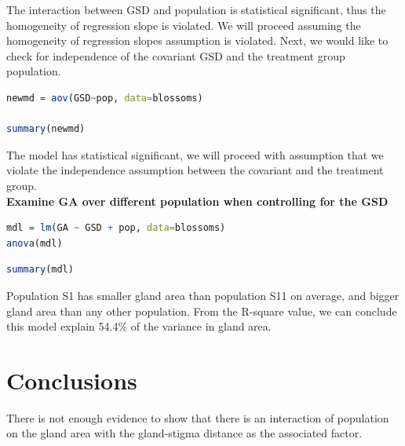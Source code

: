 \documentclass{article}
\begin{document}
The interaction between GSD and population is statistical significant, thus the homogeneity of regression slope is violated. We will proceed assuming the homogeneity of regression slopes assumption is violated. Next, we would like to check for independence of the covariant GSD and the treatment group population.\\

\begin{lstlisting}[language=R]
newmd = aov(GSD~pop, data=blossoms)

summary(newmd)
\end{lstlisting}


The model has statistical significant, we will proceed with assumption that we violate the independence assumption between the covariant and the treatment group.\\
\break
\textbf{Examine GA over different population when controlling for the GSD\\}
\begin{lstlisting}[language=R]
mdl = lm(GA ~ GSD + pop, data=blossoms)
anova(mdl)
\end{lstlisting}

\break
\begin{lstlisting}[language=R]
summary(mdl)
\end{lstlisting}


Population S1 has smaller gland area than population S11 on average, and bigger gland area than any other population. From the R-square value, we can conclude this model explain 54.4\% of the variance in gland area.

\section{Conclusions}
There is not enough evidence to show that there is an interaction of population on the gland area with the gland-stigma distance as the associated factor.
\end{document}
